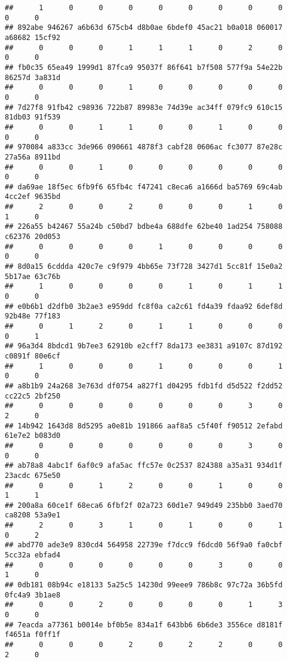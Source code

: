 \documentclass[
]{article}
\begin{document}
\begin{verbatim}
##      1      0      0      0      0      0      0      0      0      0      0 
## 892abe 946267 a6b63d 675cb4 d8b0ae 6bdef0 45ac21 b0a018 060017 a68682 15cf92 
##      0      0      0      1      1      1      0      2      0      0      0 
## fb0c35 65ea49 1999d1 87fca9 95037f 86f641 b7f508 577f9a 54e22b 86257d 3a831d 
##      0      0      0      1      0      0      0      0      0      0      0 
## 7d27f8 91fb42 c98936 722b87 89983e 74d39e ac34ff 079fc9 610c15 81db03 91f539 
##      0      0      1      1      0      0      1      0      0      0      0 
## 970084 a833cc 3de966 090661 4878f3 cabf28 0606ac fc3077 87e28c 27a56a 8911bd 
##      0      0      1      0      0      0      0      0      0      0      0 
## da69ae 18f5ec 6fb9f6 65fb4c f47241 c8eca6 a1666d ba5769 69c4ab 4cc2ef 9635bd 
##      2      0      0      2      0      0      0      1      0      1      0 
## 226a55 b42467 55a24b c50bd7 bdbe4a 688dfe 62be40 1ad254 758088 c62376 20d053 
##      0      0      0      0      1      0      0      0      0      0      0 
## 8d0a15 6cddda 420c7e c9f979 4bb65e 73f728 3427d1 5cc81f 15e0a2 5b17ae 63c76b 
##      1      0      0      0      0      1      0      1      1      0      0 
## e0b6b1 d2dfb0 3b2ae3 e959dd fc8f0a ca2c61 fd4a39 fdaa92 6def8d 92b48e 77f183 
##      0      1      2      0      1      1      0      0      0      0      1 
## 96a3d4 8bdcd1 9b7ee3 62910b e2cff7 8da173 ee3831 a9107c 87d192 c0891f 80e6cf 
##      1      0      0      0      1      0      0      0      1      0      0 
## a8b1b9 24a268 3e763d df0754 a827f1 d04295 fdb1fd d5d522 f2dd52 cc22c5 2bf250 
##      0      0      0      0      0      0      0      3      0      2      0 
## 14b942 1643d8 8d5295 a0e81b 191866 aaf8a5 c5f40f f90512 2efabd 61e7e2 b083d0 
##      0      0      0      0      0      0      0      3      0      0      0 
## ab78a8 4abc1f 6af0c9 afa5ac ffc57e 0c2537 824388 a35a31 934d1f 23acdc 675e50 
##      0      0      1      2      0      0      1      0      0      1      1 
## 200a8a 60ce1f 68eca6 6fbf2f 02a723 60d1e7 949d49 235bb0 3aed70 ca8208 53a9e1 
##      2      0      3      1      0      1      0      0      1      0      2 
## abd770 ade3e9 830cd4 564958 22739e f7dcc9 f6dcd0 56f9a0 fa0cbf 5cc32a ebfad4 
##      0      0      0      0      0      0      3      0      0      1      0 
## 0db181 08b94c e18133 5a25c5 14230d 99eee9 786b8c 97c72a 36b5fd 0fc4a9 3b1ae8 
##      0      0      2      0      0      0      0      1      3      0      0 
## 7eacda a77361 b0014e bf0b5e 834a1f 643bb6 6b6de3 3556ce d8181f f4651a f0ff1f 
##      0      0      0      2      0      2      2      0      0      2      0 

\end{verbatim}
\end{document}
